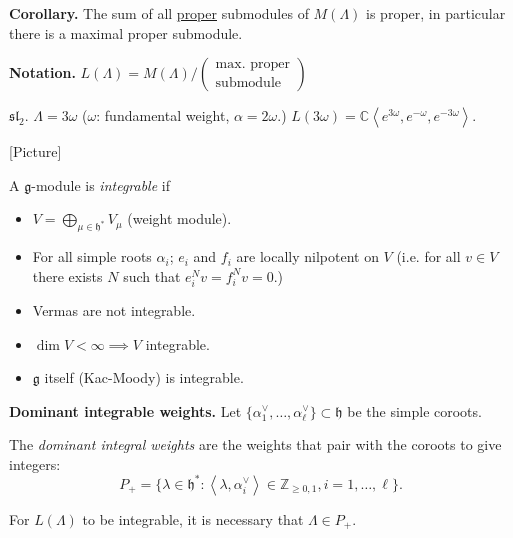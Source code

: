 {\bf Corollary.} The sum of all
\underline{proper} submodules
of  $M(\Lambda)$ is proper, in particular
there is a maximal proper submodule.

{\bf Notation.}
$L(\Lambda)=M(\Lambda)\Big/\left(\substack{
\text{max. proper} \\
\text{submodule}}\right)$

\begin{example}
\label{example-}
$\mathfrak{sl}_2$. $\Lambda=3\omega$
($\omega$: fundamental weight,
$\alpha=2\omega$.)
$L(3\omega)=\mathbb{C}\left\langle{}e^{3\omega},e^{-
\omega},e^{-3\omega}\right\rangle{}$.

[Picture]
\end{example}

\begin{definition}
\label{definition-integrable-g-module}
A $\mathfrak{g}$-module is {\it integrable}
if
\begin{itemize}
\item $V=\bigoplus_{\mu \in
\mathfrak{h}^*}V_\mu$ (weight module).
\item For all simple roots $\alpha_i$; $e_i$
and $f_i$ are
locally nilpotent on $V$ (i.e. for all $v \in
V$
there exists $N$ such that
$e_i^Nv=f_i^Nv=0$.)
\end{itemize}
\end{definition}

\begin{remark}
\label{remark-integrability}
\begin{itemize}
\item Vermas are not integrable.
\item $\dim V< \infty \implies V$ integrable.
\item $\mathfrak{g}$ itself (Kac-Moody) is
integrable.
\end{itemize}
\end{remark}

\medskip\noindent
{\bf Dominant integrable weights.}
Let
$\{\alpha_1^\vee,\ldots,\alpha_\ell^\vee\}
\subset\mathfrak{h}$
be the simple
coroots.

\begin{definition}
\label{definition-dominant-integral-weights}
The {\it dominant integral weights} are the
weights that pair with the coroots
to give integers:
$$
P_+=\{\lambda \in \mathfrak{h}^* :
\left\langle{}\lambda,
\alpha_i^\vee\right\rangle{}\in\mathbb{Z}_{\geq
0,1},
i=1,\ldots,\ell\}.
$$
\end{definition}

For $L(\Lambda)$ to be integrable, it is
necessary that $\Lambda \in P_+$.

